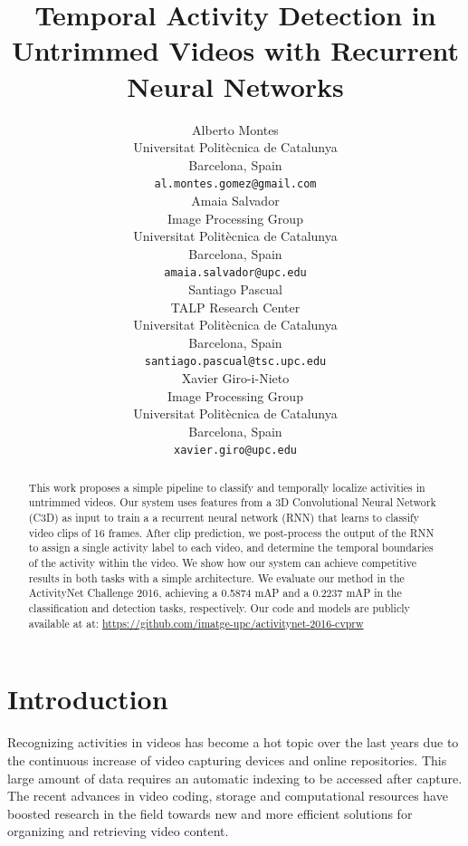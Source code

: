 \documentclass{article}
\title{Temporal Activity Detection in Untrimmed Videos with Recurrent Neural Networks}
\author{
    Alberto Montes \\
    Universitat Politècnica de Catalunya \\
    Barcelona, Spain \\
    \texttt{al.montes.gomez@gmail.com} \\
    \And
    Amaia Salvador \\
    Image Processing Group \\
    Universitat Politècnica de Catalunya \\
    Barcelona, Spain \\
    \texttt{amaia.salvador@upc.edu} \\
    \And
    Santiago Pascual \\
    TALP Research Center \\
    Universitat Politècnica de Catalunya \\
    Barcelona, Spain \\
    \texttt{santiago.pascual@tsc.upc.edu} \\
    \And
    Xavier Giro-i-Nieto \\
    Image Processing Group \\
    Universitat Politècnica de Catalunya \\
    Barcelona, Spain \\
    \texttt{xavier.giro@upc.edu} \\
}
\begin{document}

\maketitle

\begin{abstract}


    This work proposes a simple pipeline to classify and temporally localize activities in untrimmed videos. Our system uses features from a 3D Convolutional Neural Network (C3D) as input to train a a recurrent neural network (RNN) that learns to classify video clips of 16 frames. After clip prediction, we post-process the output of the RNN to assign a single activity label to each video, and determine the temporal boundaries of the activity within the video. We show how our system can achieve competitive results in both tasks with a simple architecture. We evaluate our method in the ActivityNet Challenge 2016, achieving a 0.5874 mAP and a 0.2237 mAP in the classification and detection tasks, respectively. Our code and models are publicly available at at: \url{https://github.com/imatge-upc/activitynet-2016-cvprw}

\end{abstract}

\section{Introduction}

Recognizing activities in videos has become a hot topic over the last years due to the continuous increase of video capturing devices and online repositories.
This large amount of data requires an automatic indexing to be accessed after capture.
The recent advances in video coding, storage and computational resources have boosted research in the field towards new and more efficient solutions for organizing and retrieving video content.
\end{document}

